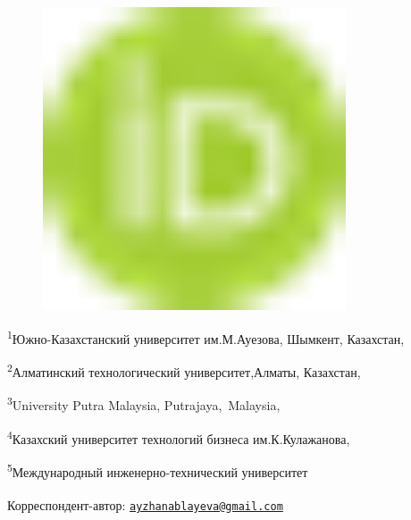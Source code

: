 \begin{figure}[H]
	\centering
	\includegraphics[width=0.8\textwidth]{media/pish/image10}
	\caption*{}
\end{figure}


\textsuperscript{1}Южно-Казахстанский университет им.М.Ауезова, Шымкент,
Казахстан,

\textsuperscript{2}Алматинский технологический университет,Алматы,
Казахстан,

\textsuperscript{3}University Putra Malaysia, Putrajaya,~Malaysia,

\textsuperscript{4}Казахский университет технологий бизнеса
им.К.Кулажанова,

\textsuperscript{5}Международный инженерно-технический университет

{\bfseries \textsuperscript{\envelope }}Корреспондент-автор:
\href{mailto:ayzhanablayeva@gmail.com}{\nolinkurl{ayzhanablayeva@gmail.com}}

